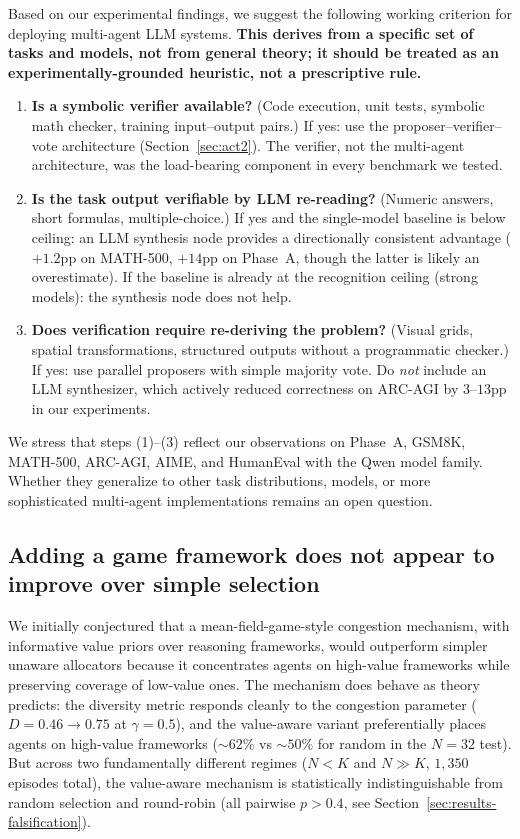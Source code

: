 \documentclass[11pt]{amsart}
\newcommand{\g}{\gamma}
\newcommand\1{{\mathds{1}}}
\theoremstyle{definition}
\theoremstyle{remark}
\numberwithin{equation}{section}
\begin{document}
Based on our experimental findings, we suggest the following working criterion for deploying multi-agent LLM systems.
\textbf{This derives from a specific set of tasks and models, not from general theory; it should be treated as an experimentally-grounded heuristic, not a prescriptive rule.}
\begin{enumerate}[leftmargin=1.4em, itemsep=2pt]
\item \textbf{Is a symbolic verifier available?} (Code execution, unit tests, symbolic math checker, training input--output pairs.)
If yes: use the proposer--verifier--vote architecture (Section~\ref{sec:act2}).
The verifier, not the multi-agent architecture, was the load-bearing component in every benchmark we tested.
\item \textbf{Is the task output verifiable by LLM re-reading?} (Numeric answers, short formulas, multiple-choice.)
If yes and the single-model baseline is below ceiling: an LLM synthesis node provides a directionally consistent advantage ($+1.2$pp on MATH-500, $+14$pp on Phase~A, though the latter is likely an overestimate).
If the baseline is already at the recognition ceiling (strong models): the synthesis node does not help.
\item \textbf{Does verification require re-deriving the problem?} (Visual grids, spatial transformations, structured outputs without a programmatic checker.)
If yes: use parallel proposers with simple majority vote.
Do \emph{not} include an LLM synthesizer, which actively reduced correctness on ARC-AGI by $3$--$13$pp in our experiments.
\end{enumerate}
We stress that steps (1)--(3) reflect our observations on Phase~A, GSM8K, MATH-500, ARC-AGI, AIME, and HumanEval with the Qwen model family.
Whether they generalize to other task distributions, models, or more sophisticated multi-agent implementations remains an open question.

\subsection{Adding a game framework does not appear to improve over simple selection}\label{sec:game-remark}

We initially conjectured that a mean-field-game-style congestion mechanism, with informative value priors over reasoning frameworks, would outperform simpler unaware allocators because it concentrates agents on high-value frameworks while preserving coverage of low-value ones.
The mechanism does behave as theory predicts: the diversity metric responds cleanly to the congestion parameter ($D=0.46 \to 0.75$ at $\g\!=\!0.5$), and the value-aware variant preferentially places agents on high-value frameworks ($\sim 62\%$ vs $\sim 50\%$ for random in the $N\!=\!32$ test).
But across two fundamentally different regimes ($N\!<\!K$ and $N\!\gg\!K$, $1{,}350$ episodes total), the value-aware mechanism is statistically indistinguishable from random selection and round-robin (all pairwise $p > 0.4$, see Section~\ref{sec:results-falsification}).
\end{document}
